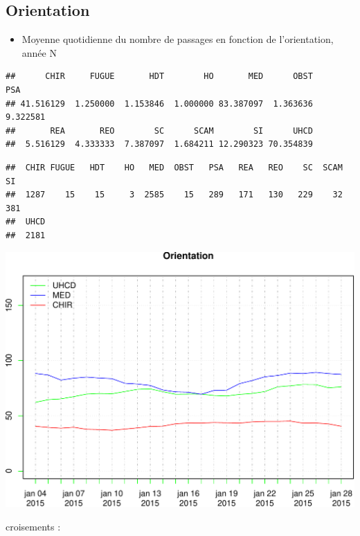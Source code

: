 \documentclass[]{article}
\begin{document}
\subsection{Orientation}\label{orientation}

\begin{itemize}
\itemsep1pt\parskip0pt
\item
  Moyenne quotidienne du nombre de passages en fonction de
  l'orientation, année N
\end{itemize}

\begin{verbatim}
##      CHIR     FUGUE       HDT        HO       MED      OBST       PSA 
## 41.516129  1.250000  1.153846  1.000000 83.387097  1.363636  9.322581 
##       REA       REO        SC      SCAM        SI      UHCD 
##  5.516129  4.333333  7.387097  1.684211 12.290323 70.354839
\end{verbatim}

\begin{verbatim}
##  CHIR FUGUE   HDT    HO   MED  OBST   PSA   REA   REO    SC  SCAM    SI 
##  1287    15    15     3  2585    15   289   171   130   229    32   381 
##  UHCD 
##  2181
\end{verbatim}

\includegraphics{rapport_2014_files/figure-latex/moyenne-orientation-1.pdf}

croisements :
\end{document}
